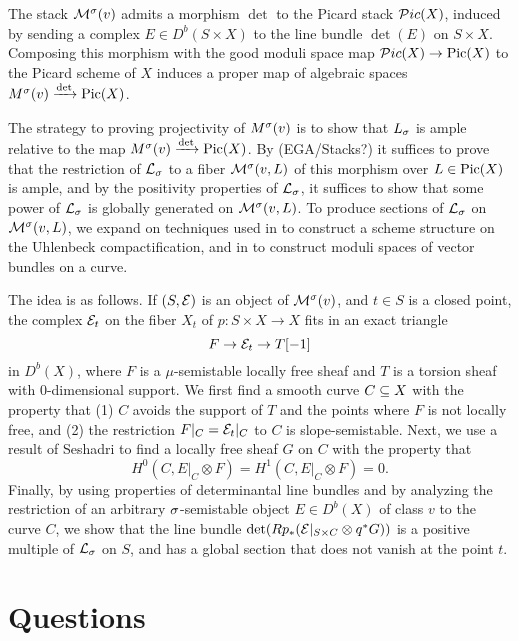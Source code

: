 \documentclass[letterpaper,10pt]{article}
\begin{document}
The stack $\mathcal{M}^\sigma(v)$ admits a morphism $\det$ to the Picard stack $\mathcal{P}ic(X)$, induced by sending a complex $E \in D^b(S \times X)$ to the line bundle $\det(E)$ on $S \times X$. Composing this morphism with the good moduli space map $\mathcal{P}ic(X) \to \mathrm{Pic}(X)$ to the Picard scheme of $X$ induces a proper map of algebraic spaces $M^\sigma(v) \xrightarrow{\det} \mathrm{Pic}(X)$.

The strategy to proving projectivity of $M^\sigma(v)$ is to show that $L_\sigma$ is ample relative to the map $M^\sigma(v) \xrightarrow{\det} \mathrm{Pic}(X)$. By (EGA/Stacks?) it suffices to prove that the restriction of $\mathcal{L}_\sigma$ to a fiber $\mathcal{M}^\sigma(v, L)$ of this morphism over $L \in \mathrm{Pic}(X)$ is ample, and by the positivity properties of $\mathcal{L}_\sigma$, it suffices to show that some power of $\mathcal{L}_\sigma$ is globally generated on $\mathcal{M}^\sigma(v, L)$. To produce sections of $\mathcal{L}_\sigma$ on $\mathcal{M}^\sigma(v,L)$, we expand on techniques used in \cite{li} to construct a scheme structure on the Uhlenbeck compactification, and in \cite{seshadri} to construct moduli spaces of vector bundles on a curve. 

The idea is as follows. If $(S, \mathcal{E})$ is an object of $\mathcal{M}^\sigma(v)$, and $t \in S$ is a closed point, the complex $\mathcal{E}_t$ on the fiber $X_t$ of $p: S \times X \to X$ fits in an exact triangle
\[ F \to \mathcal{E}_t \to T[-1] \]
in $D^b(X)$, where $F$ is a $\mu$-semistable locally free sheaf and $T$ is a torsion sheaf with 0-dimensional support. We first find a smooth curve $C \subseteq X$ with the property that (1) $C$ avoids the support of $T$ and the points where $F$ is not locally free, and (2) the restriction $F|_C = \mathcal{E}_t|_C$ to $C$ is slope-semistable. Next, we use a result of Seshadri to find a locally free sheaf $G$ on $C$ with the property that 
\[ H^0(C, E|_C \otimes F) = H^1(C, E|_C \otimes F) = 0. \]
Finally, by using properties of determinantal line bundles and by analyzing the restriction of an arbitrary $\sigma$-semistable object $E \in D^b(X)$ of class $v$ to the curve $C$, we show that the line bundle $\det(R p_*(\mathcal{E}|_{S\times C} \otimes q^*G))$ is a positive multiple of $\mathcal{L}_\sigma$ on $S$, and has a global section that does not vanish at the point $t$. 


\section{Questions}
\end{document}
